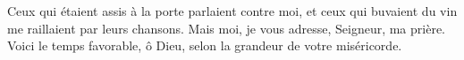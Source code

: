 Ceux qui étaient assis à la porte parlaient contre moi, et ceux qui buvaient du vin me raillaient par leurs chansons. Mais moi, je vous adresse, Seigneur, ma prière. Voici le temps favorable, ô Dieu, selon la grandeur de votre miséricorde.
